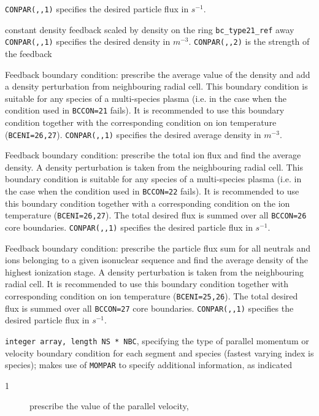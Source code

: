 \documentclass[a4paper,10pt]{report}
\begin{document}
\begin{description}
\begin{description}
  {\tt CONPAR(,,1)} specifies the desired particle flux in $s^{-1}$.
  \item[24] constant density feedback scaled by density on the ring {\tt bc\_type21\_ref} away
  {\tt CONPAR(,,1)} specifies the desired density in $m^{-3}$.
  {\tt CONPAR(,,2)} is the strength of the feedback
  \item[25] Feedback boundary condition: prescribe the average value of the density and add a density perturbation from neighbouring radial cell. This boundary condition is suitable for any species of a multi-species plasma (i.e. in the case when the condition used in {\tt BCCON=21} fails). It is recommended to use this boundary condition together with the corresponding condition on ion temperature ({\tt BCENI=26,27}).
  {\tt CONPAR(,,1)} specifies the desired average density in $m^{-3}$.
  \item[26] Feedback boundary condition: prescribe the total ion flux and find the average density. A density perturbation is taken from the neighbouring radial cell. This boundary condition is suitable for any species of a multi-species plasma (i.e. in the case when the condition used in {\tt BCCON=22} fails). It is recommended to use this boundary condition together with a corresponding condition on the ion temperature ({\tt BCENI=26,27}). The total desired flux is summed over all {\tt BCCON=26} core boundaries.
  {\tt CONPAR(,,1)} specifies the desired particle flux in $s^{-1}$.
  \item[27] Feedback boundary condition: prescribe the particle flux sum for all neutrals and ions belonging to a given isonuclear sequence and find the average density of the highest ionization stage. A density perturbation is taken from the neighbouring radial cell. It is recommended to use this boundary condition together with corresponding condition on ion temperature ({\tt BCENI=25,26}). The total desired flux is summed over all {\tt BCCON=27} core boundaries.
  {\tt CONPAR(,,1)} specifies the desired particle flux in $s^{-1}$.
  \end{description}
\item[BCMOM] {\tt integer array, length NS * NBC}, specifying
  the type of parallel momentum or velocity boundary condition for each segment
  and species (fastest varying index is species); makes use of {\tt MOMPAR} to
  specify additional information, as indicated
  \begin{description}
  \item[1] prescribe the value of the parallel velocity,

\end{description}
\end{description}
\end{document}
